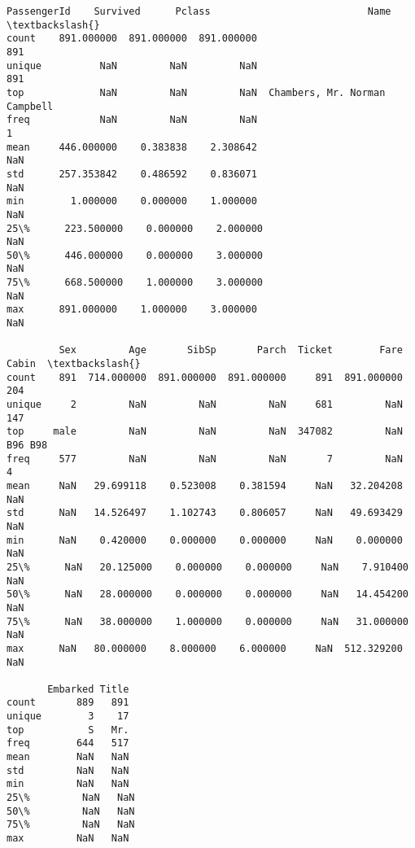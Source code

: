 \documentclass[9pt]{ltjsarticle}
\makeatletter
\newcommand{\boxspacing}{\kern\kvtcb@left@rule\kern\kvtcb@boxsep}
\newcommand{\prompt}[4]{
        {\ttfamily\llap{{\color{#2}[#3]:\hspace{3pt}#4}}\vspace{-\baselineskip}}
    }
\makeatother
\begin{document}
            \begin{tcolorbox}[breakable, size=fbox, boxrule=.5pt, pad at break*=1mm, opacityfill=0]
\prompt{Out}{outcolor}{11}{\boxspacing}
\begin{Verbatim}[commandchars=\\\{\}]
        PassengerId    Survived      Pclass                           Name  \textbackslash{}
count    891.000000  891.000000  891.000000                            891
unique          NaN         NaN         NaN                            891
top             NaN         NaN         NaN  Chambers, Mr. Norman Campbell
freq            NaN         NaN         NaN                              1
mean     446.000000    0.383838    2.308642                            NaN
std      257.353842    0.486592    0.836071                            NaN
min        1.000000    0.000000    1.000000                            NaN
25\%      223.500000    0.000000    2.000000                            NaN
50\%      446.000000    0.000000    3.000000                            NaN
75\%      668.500000    1.000000    3.000000                            NaN
max      891.000000    1.000000    3.000000                            NaN

         Sex         Age       SibSp       Parch  Ticket        Fare    Cabin  \textbackslash{}
count    891  714.000000  891.000000  891.000000     891  891.000000      204
unique     2         NaN         NaN         NaN     681         NaN      147
top     male         NaN         NaN         NaN  347082         NaN  B96 B98
freq     577         NaN         NaN         NaN       7         NaN        4
mean     NaN   29.699118    0.523008    0.381594     NaN   32.204208      NaN
std      NaN   14.526497    1.102743    0.806057     NaN   49.693429      NaN
min      NaN    0.420000    0.000000    0.000000     NaN    0.000000      NaN
25\%      NaN   20.125000    0.000000    0.000000     NaN    7.910400      NaN
50\%      NaN   28.000000    0.000000    0.000000     NaN   14.454200      NaN
75\%      NaN   38.000000    1.000000    0.000000     NaN   31.000000      NaN
max      NaN   80.000000    8.000000    6.000000     NaN  512.329200      NaN

       Embarked Title
count       889   891
unique        3    17
top           S   Mr.
freq        644   517
mean        NaN   NaN
std         NaN   NaN
min         NaN   NaN
25\%         NaN   NaN
50\%         NaN   NaN
75\%         NaN   NaN
max         NaN   NaN
\end{Verbatim}
\end{tcolorbox}
        
\end{document}
